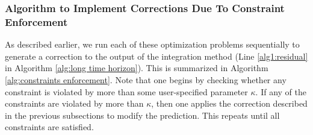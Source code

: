 
\subsubsection{Algorithm to Implement Corrections Due To Constraint Enforcement}
As described earlier, we run each of these optimization problems sequentially to generate a correction to the output of the integration method (Line \ref{alg1:residual} in Algorithm \ref{alg:long time horizon}). 
This is summarized in Algorithm \ref{alg:constraints enforcement}.
Note that one begins by checking whether any constraint is violated by more than some user-specified parameter $\kappa$. 
If any of the constraints are violated by more than $\kappa$, then one applies the correction described in the previous subsections to modify the prediction. 
This repeats until all constraints are satisfied. 

